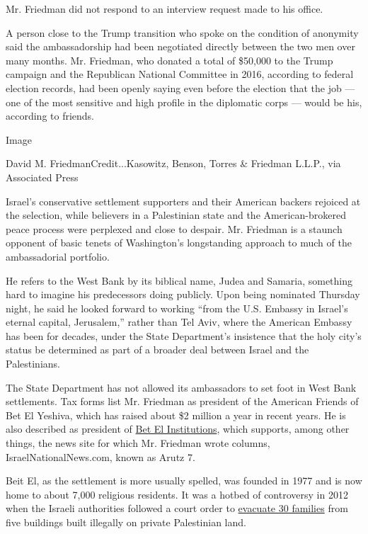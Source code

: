 Mr. Friedman did not respond to an interview request made to his office.

A person close to the Trump transition who spoke on the condition of
anonymity said the ambassadorship had been negotiated directly between
the two men over many months. Mr. Friedman, who donated a total of
\$50,000 to the Trump campaign and the Republican National Committee in
2016, according to federal election records, had been openly saying even
before the election that the job --- one of the most sensitive and high
profile in the diplomatic corps --- would be his, according to friends.

Image

David M. FriedmanCredit...Kasowitz, Benson, Torres \& Friedman L.L.P.,
via Associated Press

Israel's conservative settlement supporters and their American backers
rejoiced at the selection, while believers in a Palestinian state and
the American-brokered peace process were perplexed and close to despair.
Mr. Friedman is a staunch opponent of basic tenets of Washington's
longstanding approach to much of the ambassadorial portfolio.

He refers to the West Bank by its biblical name, Judea and Samaria,
something hard to imagine his predecessors doing publicly. Upon being
nominated Thursday night, he said he looked forward to working ``from
the U.S. Embassy in Israel's eternal capital, Jerusalem,'' rather than
Tel Aviv, where the American Embassy has been for decades, under the
State Department's insistence that the holy city's status be determined
as part of a broader deal between Israel and the Palestinians.

The State Department has not allowed its ambassadors to set foot in West
Bank settlements. Tax forms list Mr. Friedman as president of the
American Friends of Bet El Yeshiva, which has raised about \$2 million a
year in recent years. He is also described as president of
\href{http://betelinstitutions.com/2016-dinner-reservations/}{Bet El
Institutions}, which supports, among other things, the news site for
which Mr. Friedman wrote columns, IsraelNationalNews.com, known as Arutz
7.

Beit El, as the settlement is more usually spelled, was founded in 1977
and is now home to about 7,000 religious residents. It was a hotbed of
controversy in 2012 when the Israeli authorities followed a court order
to
\href{http://www.nytimes.com/2012/06/27/world/middleeast/jewish-settlers-begin-evacuation-of-ulpana.html}{evacuate
30 families} from five buildings built illegally on private Palestinian
land.

